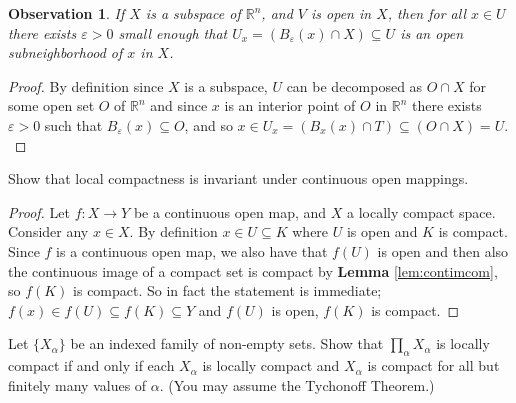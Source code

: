 \documentclass[addpoints,10pt]{exam}
\theoremstyle{plain}
\theoremstyle{definition}
\newtheorem{prob}[thm]{Problem}
\theoremstyle{plain}
\newtheorem{obs}[thm]{Observation}
\theoremstyle{definition}
\let\oldprob\prob
\let\endoldprob\endprob
\renewenvironment{prob}
  {\begin{singlespace}\oldprob}
  {\endoldprob\end{singlespace}}
\newcommand{\RR}{\ensuremath{\mathbb{R}}}
\begin{document}
\begin{obs}\label{obs:ballinsub}
If $X$ is a subspace of $\RR^{n}$, and $V$ is open in $X$, then for all $x\in U$ there exists $\varepsilon>0$ small enough that $U_{x}=(B_{\varepsilon}(x)\cap X)\subseteq U$ is an open subneighborhood of $x$ in $X$.
\end{obs}
  \begin{proof}
    By definition since $X$ is a subspace, $U$ can be decomposed as $O\cap X$ for some open set $O$ of $\RR^{n}$ and since $x$ is an interior point of $O$ in $\RR^{n}$ there exists $\varepsilon>0$ such that $B_{\varepsilon}(x)\subseteq O$, and so $x\in U_{x}=(B_{x}(x)\cap T)\subseteq (O\cap X)=U.$
  \end{proof}

\setcounter{thm}{0}
\begin{prob}
Show that local compactness is invariant under continuous open mappings.
\end{prob}

\begin{proof}
Let $f:X\to Y$ be a continuous open map, and $X$ a locally compact space. Consider any $x\in X$. By definition $x\in U\subseteq K$ where $U$ is open and $K$ is compact. Since $f$ is a continuous open map, we also have that $f(U)$ is open and then also the continuous image of a compact set is compact by \textbf{Lemma }\ref{lem:contimcom}, so $f(K)$ is compact. So in fact the statement is immediate; $f(x)\in f(U)\subseteq f(K)\subseteq Y$ and $f(U)$ is open, $f(K)$ is compact.

\end{proof}

\begin{prob}
Let $\{X_{\alpha}\}$ be an indexed family of non-empty sets. Show that
$\prod_{\alpha}X_{\alpha}$ is locally compact if and only if each
$X_{\alpha}$ is locally compact and $X_{\alpha}$ is compact for all but
finitely many values of $\alpha$. (You may assume the Tychonoff Theorem.)
\end{prob}
\end{document}
